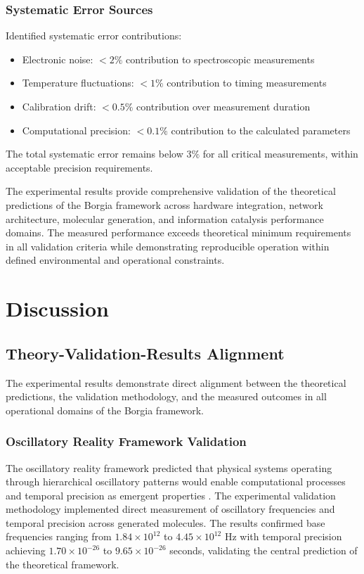 \documentclass[12pt,a4paper]{article}
\begin{document}
\subsubsection{Systematic Error Sources}

Identified systematic error contributions:

\begin{itemize}
\item Electronic noise: $< 2\%$ contribution to spectroscopic measurements
\item Temperature fluctuations: $< 1\%$ contribution to timing measurements
\item Calibration drift: $< 0.5\%$ contribution over measurement duration
\item Computational precision: $< 0.1\%$ contribution to the calculated parameters
\end{itemize}

The total systematic error remains below $3\%$ for all critical measurements, within acceptable precision requirements.

The experimental results provide comprehensive validation of the theoretical predictions of the Borgia framework across hardware integration, network architecture, molecular generation, and information catalysis performance domains. The measured performance exceeds theoretical minimum requirements in all validation criteria while demonstrating reproducible operation within defined environmental and operational constraints.


\section{Discussion}

\subsection{Theory-Validation-Results Alignment}

The experimental results demonstrate direct alignment between the theoretical predictions, the validation methodology, and the measured outcomes in all operational domains of the Borgia framework.

\subsubsection{Oscillatory Reality Framework Validation}

The oscillatory reality framework predicted that physical systems operating through hierarchical oscillatory patterns would enable computational processes and temporal precision as emergent properties . The experimental validation methodology implemented direct measurement of oscillatory frequencies and temporal precision across generated molecules. The results confirmed base frequencies ranging from $1.84 \times 10^{12}$ to $4.45 \times 10^{12}$ Hz with temporal precision achieving $1.70 \times 10^{-26}$ to $9.65 \times 10^{-26}$ seconds, validating the central prediction of the theoretical framework.
\end{document}
